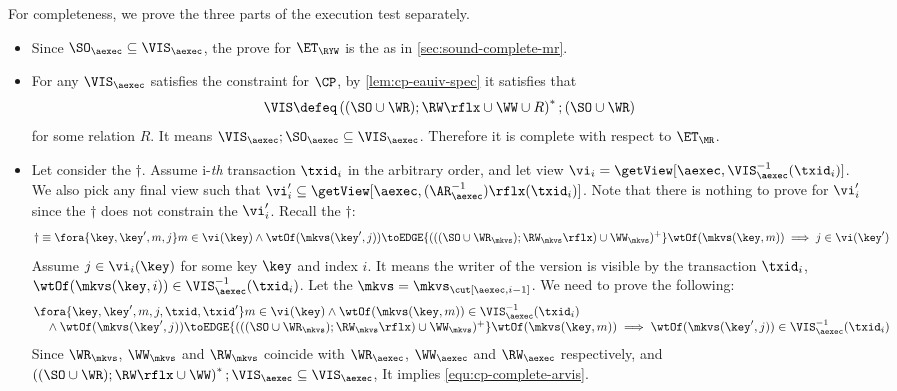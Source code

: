     
For completeness, we prove the three parts of the execution test separately.
\begin{itemize}
\item Since \( \SO_\aexec \subseteq \VIS_\aexec  \), the prove for \( \ET_\RYW \) is the as in \cref{sec:sound-complete-mr}.
\item For any \( \VIS_\aexec \)  satisfies the constraint for \( \CP \), by \cref{lem:cp-eauiv-spec} it satisfies that 
\[
    \VIS \defeq \left( (\SO \cup \WR ) ; \RW\rflx \cup \WW \cup R \right)^* ; (\SO \cup \WR )
\]
for some relation \( R \).
It means \( \VIS_\aexec ; \SO_\aexec \subseteq \VIS_\aexec \).
Therefore it is complete with respect to \( \ET_\MR \).

\item Let consider the \( \dagger \).
Assume i-\emph{th} transaction \( \txid_i \) in the arbitrary order,
and let view \( \vi_{i} = \getView[\aexec, \VIS^{-1}_{\aexec}(\txid_{i})] \).
We also pick any final view such that \( \vi'_{i} \subseteq \getView[\aexec, (\AR^{-1}_{\aexec})\rflx(\txid_{i})] \).
Note that there is nothing to prove for \( \vi'_i \) since the \( \dagger \) does not constrain the \( \vi'_i \).
Recall the \( \dagger \):
\[
\dagger  \equiv 
        \fora{\key, \key', m, j}
             m \in \vi(\key)  \land \wtOf(\mkvs(\key', j)) \toEDGE{(((\SO \cup \WR_{\mkvs}) ; \RW_{\mkvs}\rflx) \cup \WW_{\mkvs})^{+}} \wtOf(\mkvs(\key, m))
         \implies j \in \vi(\key')  
\]
Assume \( j \in \vi_i(\key) \) for some key \(\key \) and index \( i \).
It means the writer of the version is visible by the transaction \( \txid_i\),
\ie \( \wtOf(\mkvs(\key,i)) \in \VIS^{-1}_{\aexec}(\txid_{i}) \).
Let the \( \mkvs = \mkvs_{\cut[\aexec, i-1]} \).
We need to prove the following:
\begin{gather}
    \label{equ:cp-complete-arvis}
    \begin{array}{@{}l@{}}
        \fora{\key, \key', m, j, \txid, \txid'} 
        m \in \vi(\key) 
        \land \wtOf(\mkvs(\key,m)) \in \VIS_\aexec^{-1}(\txid_i) \\
        \quad {} \land \wtOf(\mkvs(\key', j)) \toEDGE{(((\SO \cup \WR_{\mkvs}) ; \RW_{\mkvs}\rflx) \cup \WW_{\mkvs})^{+}} \wtOf(\mkvs(\key, m)) 
            \implies \wtOf(\mkvs(\key',j)) \in \VIS_\aexec^{-1}(\txid_i)
    \end{array}
\end{gather}
Since \( \WR_\mkvs \), \( \WW_\mkvs \) and \( \RW_\mkvs \) coincide with
\( \WR_\aexec \), \( \WW_\aexec \) and \( \RW_\aexec \) respectively,
and \( \left( (\SO \cup \WR ) ; \RW\rflx \cup \WW \right)^* ; \VIS_\aexec \subseteq \VIS_\aexec \),
It implies \cref{equ:cp-complete-arvis}.
\end{itemize}
